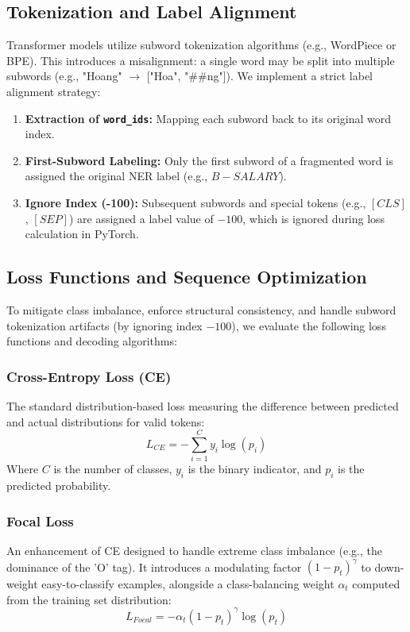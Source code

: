 \subsection{Tokenization and Label Alignment}
Transformer models utilize subword tokenization algorithms (e.g., WordPiece or BPE). This introduces a misalignment: a single word may be split into multiple subwords (e.g., "Hoang" $\rightarrow$ ["Hoa", "\#\#ng"]). We implement a strict label alignment strategy:
\begin{enumerate}
    \item \textbf{Extraction of \texttt{word\_ids}:} Mapping each subword back to its original word index.
    \item \textbf{First-Subword Labeling:} Only the first subword of a fragmented word is assigned the original NER label (e.g., $B-SALARY$).
    \item \textbf{Ignore Index (-100):} Subsequent subwords and special tokens (e.g., $[CLS]$, $[SEP]$) are assigned a label value of $-100$, which is ignored during loss calculation in PyTorch.
\end{enumerate}

\subsection{Loss Functions and Sequence Optimization}
To mitigate class imbalance, enforce structural consistency, and handle subword tokenization artifacts (by ignoring index $-100$), we evaluate the following loss functions and decoding algorithms:

\subsubsection{Cross-Entropy Loss (CE)}
The standard distribution-based loss measuring the difference between predicted and actual distributions for valid tokens:
\begin{equation}
	L_{CE} = -\sum_{i=1}^{C} y_i \log(p_i)
\end{equation}
Where $C$ is the number of classes, $y_i$ is the binary indicator, and $p_i$ is the predicted probability.

\subsubsection{Focal Loss}
An enhancement of CE designed to handle extreme class imbalance (e.g., the dominance of the 'O' tag). It introduces a modulating factor $(1 - p_t)^\gamma$ to down-weight easy-to-classify examples, alongside a class-balancing weight $\alpha_t$ computed from the training set distribution:
\begin{equation}
	L_{Focal} = -\alpha_t (1 - p_t)^\gamma \log(p_t)
\end{equation}

